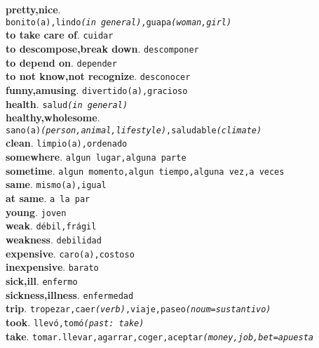 \documentclass[twocolumn]{article}
\begin{document}
	\textsf{\textbf{pretty,nice}}.\\\texttt{bonito(a),lindo{\scriptsize \textsl{(in general)}},guapa{\scriptsize \textsl{(woman,girl)}}}\\
	\textsf{\textbf{to take care of}}. \texttt{cuidar}\\
	\textsf{\textbf{to descompose,break down}}. \texttt{descomponer}\\
	\textsf{\textbf{to depend on}}. \texttt{depender}\\
	\textsf{\textbf{to not know,not recognize}}. \texttt{desconocer}\\
	\textsf{\textbf{funny,amusing}}. \texttt{divertido(a),gracioso}\\
	\textsf{\textbf{health}}. \texttt{salud{\scriptsize \textsl{(in general)}}}\\
	\textsf{\textbf{healthy,wholesome}}.\\
			  \texttt{sano(a){\scriptsize \textsl{(person,animal,lifestyle)}},saludable{\scriptsize \textsl{(climate)}}}\\
   \textsf{\textbf{clean}}. \texttt{limpio(a),ordenado}\\
	\textsf{\textbf{somewhere}}. \texttt{algun lugar,alguna parte}\\
	\textsf{\textbf{sometime}}. \texttt{algun momento,algun tiempo,alguna vez,a veces}\\
	\textsf{\textbf{same}}. \texttt{mismo(a),igual}\\
	\textsf{\textbf{at same}}. \texttt{a la par}\\
	\textsf{\textbf{young}}. \texttt{joven}\\
	\textsf{\textbf{weak}}. \texttt{d\'ebil,fr\'agil}\\
	\textsf{\textbf{weakness}}. \texttt{debilidad}\\
	\textsf{\textbf{expensive}}. \texttt{caro(a),costoso}\\
	\textsf{\textbf{inexpensive}}. \texttt{barato}\\
	\textsf{\textbf{sick,ill}}. \texttt{enfermo}\\
	\textsf{\textbf{sickness,illness}}. \texttt{enfermedad}\\
	\textsf{\textbf{trip}}. \texttt{tropezar,caer{\scriptsize \textsl{(verb)}},viaje,paseo{\scriptsize \textsl{(noum=sustantivo)}}}\\
	\textsf{\textbf{took}}. \texttt{llev\'o,tom\'o{\scriptsize \textsl{(past: take)}}}\\
	\textsf{\textbf{take}}. \texttt{tomar.llevar,agarrar,coger,aceptar{\scriptsize \textsl{(money,job,bet=apuesta}}}\\
\end{document}
